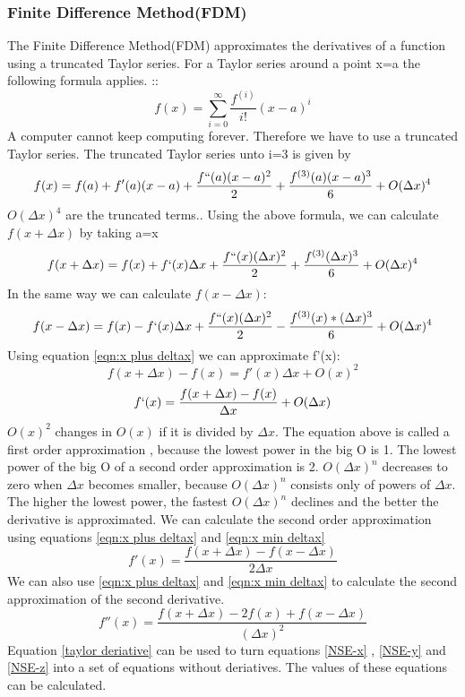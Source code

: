 \documentclass{article}
\begin{document}
\subsubsection{Finite Difference Method(FDM)}
The Finite Difference Method(FDM) approximates the derivatives of a function using a truncated Taylor series. For a Taylor series around a point x=a the following formula applies. :\cite{Taylor series}:
\[f(x)=\sum_{i=0}^{\infty}\frac{f^{(i)}}{i!}(x-a)^{i}\]
A computer cannot keep computing forever. Therefore we have to use a truncated Taylor series. The truncated Taylor series unto i=3 is given by \cite{Taylor series approximation}
\[f(x)=f(a)+f'(a)(x-a)+\frac{f``(a)(x-a)^{2}}{2} + \frac{f^{(3)}(a)(x-a)^{3}}{6}+O(\Delta x)^{4}\]
$O(\Delta x) ^{4}$ are the truncated terms.\cite{Big O}. Using the above formula, we can calculate $f(x+\Delta x)$ by taking a=x\cite{quantstart FDM}
\begin{equation}f(x+\Delta x)=f(x)+f`(x)\Delta x + \frac{f``(x) (\Delta x)^{2}}{2}+ \frac{f^{(3)} (\Delta x)^{3}}{6} + O(\Delta x)^{4}\label{eqn:x plus deltax}\end{equation}
In the same way we can calculate $f(x-\Delta x)$:
\begin{equation}f(x- \Delta x)=f(x)-f`(x)\Delta x + \frac{f``(x)(\Delta x)^{2}}{2}-\frac{f^{(3)}(x)*(\Delta x)^{3}}{6} + O(\Delta x) ^{4} \label{eqn:x min deltax}\end{equation}
Using equation \ref{eqn:x plus deltax} we can approximate f'(x):
\[f(x+\Delta x) -f(x) = f'(x)\Delta x + O(x)^{2}\]
\[f`(x)=\frac{f(x+\Delta x) - f(x)}{\Delta x} + O(\Delta x)\]
$O(x)^{2}$ changes in $O(x)$ if it is divided by $\Delta x $. The equation above is called a first order approximation , because the lowest power in the big O is 1. The lowest power of the big O of a second order approximation is 2. $O(\Delta x)^{n}$ decreases to zero when $\Delta x$ becomes smaller, because $O(\Delta x)^{n}$ consists only of powers of $\Delta x$. The higher the lowest power, the fastest $O(\Delta x)^{n}$ declines and the better the derivative is approximated. We can calculate the second order approximation using equations \ref{eqn:x plus deltax} and \ref{eqn:x min deltax}
\begin{equation}f'(x)=\frac{f(x+\Delta x)-f(x-\Delta x)}{2\Delta x}\label{taylor deriative}\end{equation}
We can also use \ref{eqn:x plus deltax} and \ref{eqn:x min deltax} to calculate the second approximation of the second derivative.
\begin{equation}f''(x)=\frac{f(x+\Delta x)-2f(x)+f(x-\Delta x)}{(\Delta x)^{2}} \label{second derivative} \end{equation}
Equation \ref{taylor deriative} can be used to turn equations \ref{NSE-x} , \ref{NSE-y} and \ref{NSE-z} into a set of equations without deriatives. The values of these equations can be calculated. 
\end{document}
